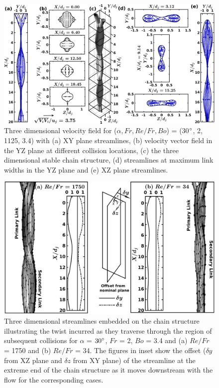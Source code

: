 \documentclass[%
 aip,
 sd,%
amsmath,amssymb,
preprint,%
author-year,%
]{revtex4-1}
\begin{document}
\begin{figure}
	\centering
	\includegraphics[width=\linewidth]{Figure6}
	\caption{Three dimensional velocity field for ($\alpha, Fr, Re/Fr, Bo$) = (30$\degree$, 2, 1125, 3.4) with (a) XY plane streamlines, (b) velocity vector field in the YZ plane at different collision locations, (c) the three dimensional stable chain structure, (d) streamlines at maximum link widths in the YZ plane and (e) XZ plane streamlines.}
	\label{Figure::streamDetails}
\end{figure}
\begin{figure}
	\centering
	\includegraphics[width=\linewidth]{Figure7}
	\caption{Three dimensional streamlines embedded on the chain structure illustrating the twist incurred as they traverse through the region of subsequent collisions for $\alpha$ = $30\degree$, $Fr$ = 2, $Bo$ = 3.4 and (a) $Re/Fr$ = 1750 and (b) $Re/Fr$ = 34. The figures in inset show the offset ($\delta y$ from XZ plane and $\delta z$ from XY plane) of the streamline at the extreme end of the chain structure as it moves downstream with the flow for the corresponding cases.}
	\label{Figure::stream3D}
\end{figure}
\end{document}
